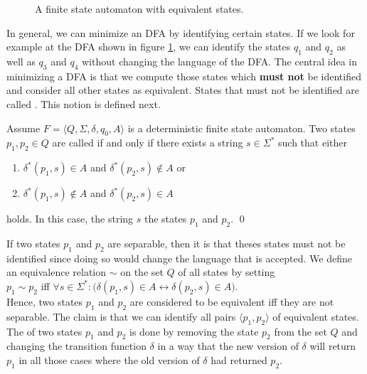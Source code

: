 \begin{figure}[!ht]
  \centering
   \caption{A finite state automaton with equivalent states.}
  \label{fig:nicht-gleichwertig.dot}
\end{figure}

In general, we can minimize an \textsc{DFA} by identifying certain states.   
If we look for example at the \textsc{DFA} shown in figure \ref{fig:nicht-gleichwertig.dot}, we can identify
the states $q_1$ and $q_2$ as well as $q_3$ and $q_4$ without changing the language of the \textsc{DFA}. 
The central idea in minimizing a \textsc{DFA} is that we compute those states which \textbf{must not} be
identified and consider all other states as equivalent.  States that must not be identified are called
.  This notion is defined next.

\begin{Definition}
Assume $F = \langle Q, \Sigma, \delta, q_0, A \rangle$ is a deterministic finite state automaton.
Two states $p_1,p_2 \in Q$ are called   if and only if there exists a string 
$s \in \Sigma^*$ such that either
\begin{enumerate}
\item $\delta^*(p_1,s) \in    A$ and $\delta^*(p_2,s) \notin A$ or
\item $\delta^*(p_1,s) \notin A$ and $\delta^*(p_2,s) \in    A$
\end{enumerate}
holds.  In this case, the string $s$   the states $p_1$ and $p_2$. \qed
\end{Definition}
If two states $p_1$ and $p_2$ are separable, then it is that theses states must not be identified since doing
so would change the language that is accepted.
We define an equivalence relation $\sim$ on the set $Q$ of all states by setting
\\[0.2cm]
\hspace*{1.3cm}
$p_1 \sim p_2$ \quad iff \quad 
$\forall s \in \Sigma^*:\bigl(\delta(p_1,s) \in A \leftrightarrow \delta(p_2,s) \in A\bigr)$.
\\[0.2cm]
Hence, two states $p_1$ and $p_2$ are considered to be equivalent iff they are not separable.   
The claim is that we can identify all pairs $\langle p_1, p_2\rangle$ of equivalent states.  The
  
of two states $p_1$ and $p_2$ is done by removing the state $p_2$ from the set $Q$ and changing the transition
function $\delta$ in a way that the new version of $\delta$ will return $p_1$ in all those cases where the old
version of $\delta$ had returned $p_2$. 


